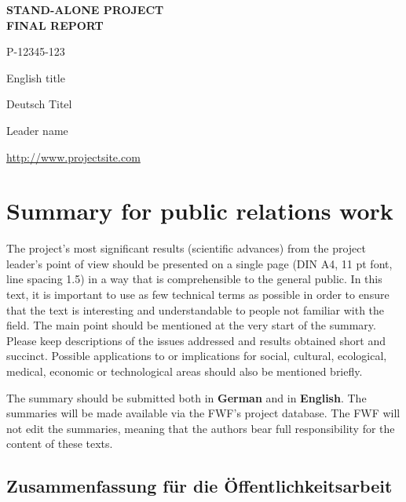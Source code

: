 \documentclass[a4paper, 11pt]{article}
\begin{document}
\begin{center}
\fontsize{16pt}{19.2pt}\selectfont
  \textbf{STAND-ALONE PROJECT}\\
  \textbf{FINAL REPORT}
\end{center}
\vspace{1cm}

 P-12345-123
\newline

English title

\makebox[3.5cm][l]{}
Deutsch Titel
\newline

 Leader name

\url{http://www.projectsite.com}

\newpage

\section{Summary for public relations work}

The project's most significant results (scientific advances) from the project
leader's point of view should be presented on a single page (DIN A4, 11 pt font,
line spacing 1.5) in a way that is comprehensible to the general public. In this
text, it is important to use as few technical terms as possible in order to
ensure that the text is interesting and understandable to people not familiar
with the field. The main point should be mentioned at the very start of the
summary. Please keep descriptions of the issues addressed and results obtained
short and succinct. Possible applications to or implications for social,
cultural, ecological, medical, economic or technological areas should also be
mentioned briefly.

The summary should be submitted both in \textbf{German} and in \textbf{English}.
The summaries will be made available via the FWF's project
database. The  FWF will not edit the summaries, meaning that the authors bear
full responsibility for the content of these texts.

\subsection{Zusammenfassung f\"{u}r die \"{O}ffentlichkeitsarbeit}
\end{document}
